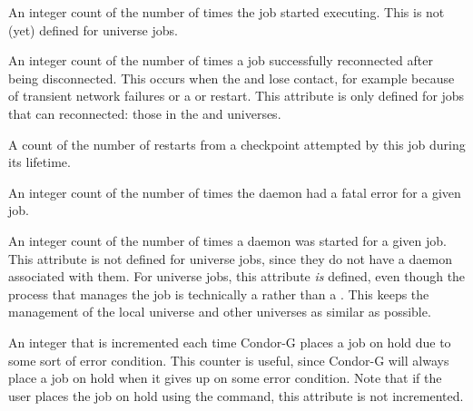 \begin{description}
\item[\AdAttr{NumJobStarts}:]  An integer count of the number of times the
  job started executing.
  This is not (yet) defined for  universe jobs.

\item[\AdAttr{NumJobReconnects}:]  An integer count of the number of times a
  job successfully reconnected after being disconnected.
  This occurs when the
   and  lose contact,
  for example because of
  transient network failures or a  or 
  restart.
  This attribute is only defined for jobs that can reconnected:
  those in the  and  universes.

\item[\AdAttr{NumRestarts}:]  A count of the number of restarts from a
checkpoint attempted by this job during its lifetime.

\item[\AdAttr{NumShadowExceptions}:]  An integer count of the number of
  times the  daemon had a fatal error for a given job.

\item[\AdAttr{NumShadowStarts}:]  An integer count of the number of
  times a  daemon was started for a given job.
  This attribute is not defined for
   universe jobs, since
  they do not have a  daemon associated with them.
  For  universe jobs, this attribute \emph{is}
  defined, even though the process that manages the job is technically
  a  rather than a .  
  This keeps the management of the
  local universe and other universes as similar as possible.

\item[\AdAttr{NumSystemHolds}:]   An integer that is incremented each time
Condor-G places a job on hold due to some sort of error condition.  This
counter is useful, since Condor-G will always place a job on hold when it
gives up on some error condition.  Note that if the user places the job
on hold using the  command, this attribute is not incremented.


\end{description}
